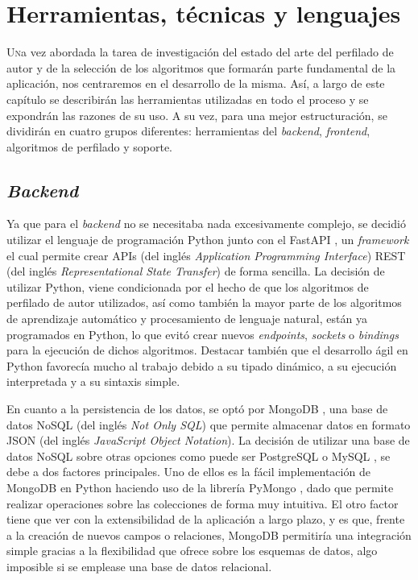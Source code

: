 \chapter{Herramientas, técnicas y lenguajes}
\label{chap:herramientas}

{
	\color{blue}
	\lettrine{U}na vez abordada la tarea de investigación del estado del arte del perfilado de autor y de la selección
	de los algoritmos que formarán parte fundamental de la aplicación, nos centraremos
	en el desarrollo de la misma.
	Así, a largo de este capítulo se describirán las herramientas utilizadas en todo el proceso y se expondrán las
	razones de su uso. A su vez, para una mejor estructuración, se dividirán en cuatro grupos diferentes:
	herramientas del \textit{backend}, \textit{frontend}, algoritmos de perfilado y soporte.
}

\section{\textit{Backend}}
\label{sec:herramientas_backend}

Ya que para el \textit{backend} no se necesitaba nada excesivamente complejo, se decidió utilizar el lenguaje de programación Python \cite{python} junto
con el FastAPI \cite{fastapi}, un \textit{framework} el cual permite crear APIs (del inglés \textit{Application Programming Interface})
REST (del inglés \textit{Representational State Transfer}) de forma sencilla. La decisión de utilizar Python, viene
condicionada por el hecho de que los algoritmos de perfilado de autor utilizados, así como también la mayor parte de los algoritmos de aprendizaje automático
y procesamiento de lenguaje natural,
están ya programados en Python, lo que evitó crear nuevos \textit{endpoints}, \textit{sockets} o \textit{bindings} para la ejecución de dichos algoritmos.
Destacar también que el desarrollo ágil en Python favorecía mucho al trabajo debido a su tipado dinámico, a su ejecución interpretada y a su sintaxis simple.

\bigskip
En cuanto a la persistencia de los datos, se optó por MongoDB \cite{mongodb}, una base de datos NoSQL (del inglés \textit{Not Only SQL}) que permite almacenar
datos en formato JSON (del inglés \textit{JavaScript Object Notation}). La decisión de utilizar una base de datos NoSQL sobre otras opciones como puede ser
PostgreSQL \cite{postgresql} o MySQL \cite{mysql}, se debe a dos factores principales. Uno de ellos es la fácil implementación de MongoDB en Python
haciendo uso de la librería PyMongo \cite{pymongo}, dado que permite realizar operaciones sobre las colecciones de forma muy intuitiva.
El otro factor tiene que ver con la extensibilidad de la aplicación a largo plazo, y es que, frente a la creación de nuevos
campos o relaciones, MongoDB permitiría una integración simple gracias a la flexibilidad que ofrece sobre los esquemas de datos, algo imposible
si se emplease una base de datos relacional.

